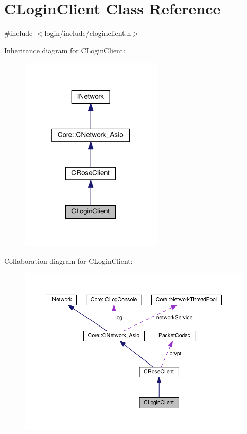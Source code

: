 \hypertarget{classCLoginClient}{}\section{C\+Login\+Client Class Reference}
\label{classCLoginClient}


{\ttfamily \#include $<$login/include/cloginclient.\+h$>$}



Inheritance diagram for C\+Login\+Client\+:
\nopagebreak
\begin{figure}[H]
\begin{center}
\leavevmode
\includegraphics[width=193pt]{classCLoginClient__inherit__graph}
\end{center}
\end{figure}


Collaboration diagram for C\+Login\+Client\+:
\nopagebreak
\begin{figure}[H]
\begin{center}
\leavevmode
\includegraphics[width=350pt]{classCLoginClient__coll__graph}
\end{center}
\end{figure}
